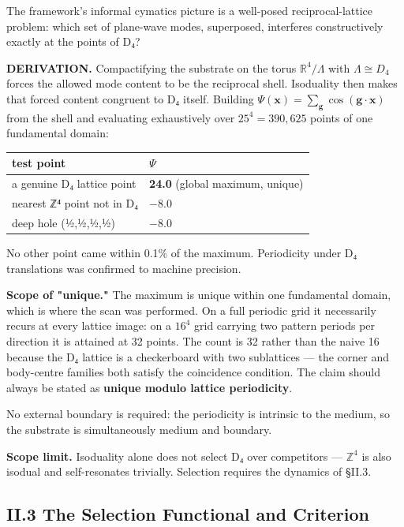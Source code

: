\documentclass[a4paper,11pt]{article}
\begin{document}
The framework's informal cymatics picture is a well-posed reciprocal-lattice problem: which set of plane-wave modes, superposed, interferes constructively exactly at the points of D₄?

\textbf{DERIVATION.} Compactifying the substrate on the torus $\mathbb{R}^4/\Lambda$ with $\Lambda\cong D_4$ forces the allowed mode content to be the reciprocal shell. Isoduality then makes that forced content congruent to D₄ itself. Building $\Psi(\mathbf{x})=\sum_{\mathbf{g}}\cos(\mathbf{g}\cdot\mathbf{x})$ from the shell and evaluating exhaustively over $25^4=390{,}625$ points of one fundamental domain:

\begin{center}
\begin{tabular}{ll}
\hline
test point & $\Psi$ \\
\hline
a genuine D₄ lattice point & \textbf{24.0} (global maximum, unique) \\
nearest ℤ⁴ point not in D₄ & $-$8.0 \\
deep hole (½,½,½,½) & $-$8.0 \\
\hline
\end{tabular}
\end{center}

No other point came within 0.1\% of the maximum. Periodicity under D₄ translations was confirmed to machine precision.

\textbf{Scope of "unique."} The maximum is unique within one fundamental domain, which is where the scan was performed. On a full periodic grid it necessarily recurs at every lattice image: on a $16^4$ grid carrying two pattern periods per direction it is attained at 32 points. The count is 32 rather than the naive 16 because the D₄ lattice is a checkerboard with two sublattices — the corner and body-centre families both satisfy the coincidence condition. The claim should always be stated as \textbf{unique modulo lattice periodicity}.

No external boundary is required: the periodicity is intrinsic to the medium, so the substrate is simultaneously medium and boundary.

\textbf{Scope limit.} Isoduality alone does not select D₄ over competitors — $\mathbb{Z}^4$ is also isodual and self-resonates trivially. Selection requires the dynamics of §II.3.

\subsection*{II.3 The Selection Functional and Criterion}
\end{document}
